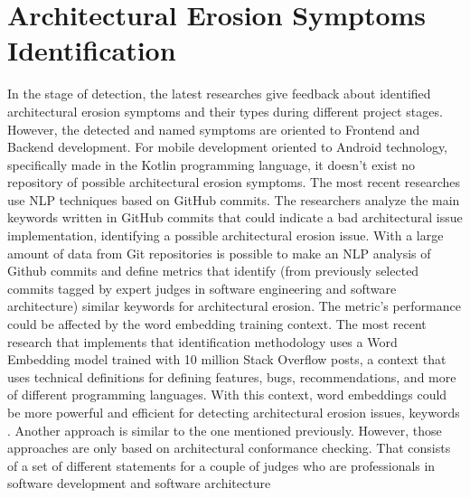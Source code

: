\section{Architectural Erosion Symptoms Identification}
In the stage of detection, the latest researches give feedback about identified architectural erosion symptoms and their types during different project stages. However, the detected and named symptoms are oriented to Frontend and Backend development. For mobile development oriented to Android technology, specifically made in the Kotlin programming language, it doesn't exist no repository of possible architectural erosion symptoms. The most recent researches use NLP techniques based on GitHub commits. The researchers analyze the main keywords written in GitHub commits that could indicate a bad architectural issue implementation, identifying a possible architectural erosion issue.
With a large amount of data from Git repositories is possible to make an NLP analysis of Github commits and define metrics that identify (from previously selected commits tagged by expert judges in software engineering and software architecture) similar keywords for architectural erosion. The metric's performance could be affected by the word embedding training context. The most recent research that implements that identification methodology uses a Word Embedding model trained with 10 million Stack Overflow posts, a context that uses technical definitions for defining features, bugs, recommendations, and more of different programming languages. With this context, word embeddings could be more powerful and efficient for detecting architectural erosion issues, keywords \cite{warnings-architectural-erosion,so-word-embedding}.
Another approach is similar to the one mentioned previously. However, those approaches are only based on architectural conformance checking. That consists of a set of different statements for a couple of judges who are professionals in software development and software architecture


